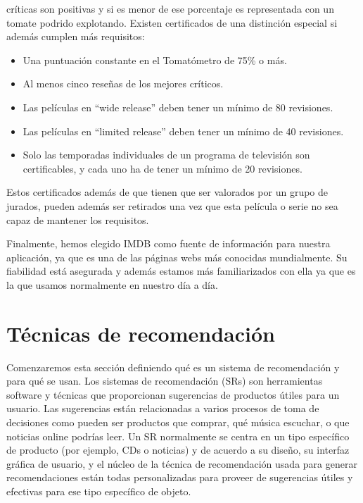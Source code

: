 \begin{itemize}
     críticas son positivas y si es menor de ese porcentaje es representada con
     un tomate podrido explotando.
    Existen certificados de una distinción especial si además cumplen más
     requisitos:
     \begin{itemize}
         \item Una puntuación constante en el Tomatómetro de 75\% o más.
         \item Al menos cinco reseñas de los mejores críticos.
         \item Las películas en ``wide release'' deben tener un mínimo de 80 revisiones.
         \item Las películas en ``limited release'' deben tener un mínimo de 40 revisiones.
         \item Solo las temporadas individuales de un programa de televisión son certificables, y cada uno ha de tener un mínimo de 20 revisiones.
     \end{itemize}
    Estos certificados además de que tienen que ser valorados por un grupo de jurados, pueden además ser retirados una vez que esta película o serie
    no sea capaz de mantener los requisitos.
\end{itemize}

Finalmente, hemos elegido IMDB como fuente de información para nuestra aplicación, ya que es una de las páginas webs más conocidas mundialmente. Su fiabilidad está asegurada y
además estamos más familiarizados con ella ya que es la que usamos normalmente en nuestro día a día.

\section{Técnicas de recomendación}
\label{makereference2.3}
Comenzaremos esta sección definiendo qué es un sistema de recomendación y para qué se usan.
Los sistemas de recomendación (SRs)\cite{HandbookRS} son herramientas software y técnicas que proporcionan sugerencias de productos útiles para un usuario. 
Las sugerencias están relacionadas a varios procesos de toma de decisiones
como pueden ser productos que comprar, qué música escuchar, o que noticias online podrías leer.
Un SR normalmente se centra en un tipo específico de producto (por ejemplo, CDs o noticias) 
y de acuerdo a su diseño, su interfaz gráfica de usuario, y el núcleo de la 
técnica de recomendación usada para generar recomendaciones están todas personalizadas para proveer de sugerencias útiles y efectivas para ese tipo específico de objeto.


